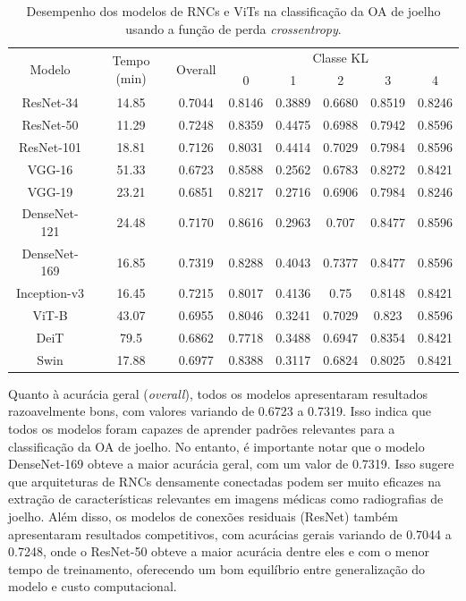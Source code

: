 \begin{table}
    \centering
    \begin{tabular}{|c|c|c|c|c|c|c|c|}
        \hline
        \multirow{2}{*}{Modelo} & \multirow{2}{*}{Tempo (min)} & \multirow{2}{*}{Overall} & \multicolumn{5}{|c|}{Classe KL} \\ \cline{4-8}
        &  &  & 0 & 1 & 2 & 3 & 4 \\ \hline
        ResNet-34 & 14.85 & 0.7044 & 0.8146 & 0.3889 & 0.6680 & 0.8519 & 0.8246 \\ \hline
        ResNet-50 & 11.29 & 0.7248 & 0.8359 & 0.4475 & 0.6988 & 0.7942 & 0.8596 \\ \hline
        ResNet-101 & 18.81 & 0.7126 & 0.8031 & 0.4414 & 0.7029 & 0.7984 & 0.8596 \\ \hline
        VGG-16 & 51.33 & 0.6723 & 0.8588 & 0.2562 & 0.6783 & 0.8272 & 0.8421 \\ \hline
        VGG-19 & 23.21 & 0.6851 & 0.8217 & 0.2716 & 0.6906 & 0.7984 & 0.8246 \\ \hline
        DenseNet-121 & 24.48 & 0.7170 & 0.8616 & 0.2963 & 0.707 & 0.8477 & 0.8596 \\ \hline
        DenseNet-169 & 16.85 & 0.7319 & 0.8288 & 0.4043 & 0.7377 & 0.8477 & 0.8596 \\ \hline
        Inception-v3 & 16.45 & 0.7215 & 0.8017 & 0.4136 & 0.75 & 0.8148 & 0.8421 \\ \hline
        ViT-B & 43.07 & 0.6955 & 0.8046 & 0.3241 & 0.7029 & 0.823 & 0.8596 \\ \hline
        DeiT & 79.5 & 0.6862 & 0.7718 & 0.3488 & 0.6947 & 0.8354 & 0.8421 \\ \hline
        Swin & 17.88 & 0.6977 & 0.8388 & 0.3117 & 0.6824 & 0.8025 & 0.8421 \\ \hline
    \end{tabular}
    \caption{Desempenho dos modelos de RNCs e ViTs na classificação da OA de joelho usando a função de perda \textit{crossentropy}.}
    \label{tab:resultados}
\end{table}

Quanto à acurácia geral (\textit{overall}), todos os modelos apresentaram resultados razoavelmente bons, com valores variando de 0.6723 a 0.7319. Isso indica que todos os modelos foram capazes de aprender padrões relevantes para a classificação da OA de joelho. No entanto, é importante notar que o modelo DenseNet-169 obteve a maior acurácia geral, com um valor de 0.7319. Isso sugere que arquiteturas de RNCs densamente conectadas podem ser muito eficazes na extração de características relevantes em imagens médicas como radiografias de joelho. Além disso, os modelos de conexões residuais (ResNet) também apresentaram resultados competitivos, com acurácias gerais variando de 0.7044 a 0.7248, onde o ResNet-50 obteve a maior acurácia dentre eles e com o menor tempo de treinamento, oferecendo um bom equilíbrio entre generalização do modelo e custo computacional.

